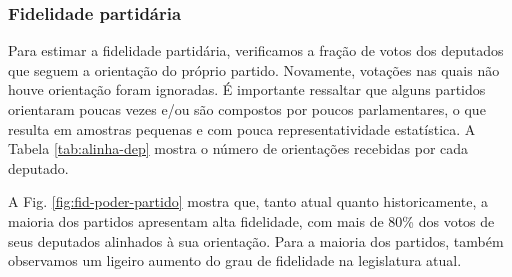 \documentclass[12pt,a4paper]{article}
\begin{document}
\subsubsection{Fidelidade partidária}

Para estimar a fidelidade partidária, verificamos a fração de votos dos deputados que seguem
a orientação do próprio partido. Novamente, votações nas quais não houve orientação foram
ignoradas. É importante ressaltar que alguns partidos orientaram poucas vezes e/ou são compostos
por poucos parlamentares, o que resulta em amostras pequenas e com pouca representatividade estatística.
A Tabela \ref{tab:alinha-dep} mostra o número de orientações recebidas por cada deputado.

A Fig. \ref{fig:fid-poder-partido} mostra que, tanto atual quanto historicamente, a maioria dos partidos
apresentam alta fidelidade, com mais de 80\% dos votos de seus deputados alinhados à sua orientação.
Para a maioria dos partidos, também observamos um ligeiro aumento do grau de fidelidade na legislatura atual.
\end{document}
